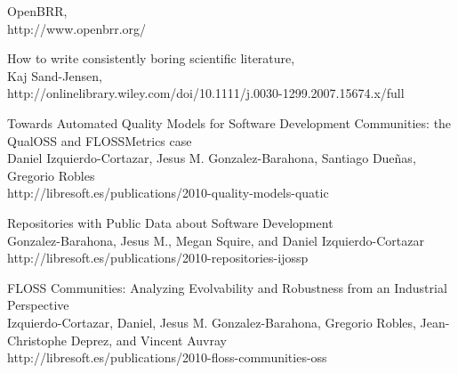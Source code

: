 \documentclass[11pt]{scrartcl}
\begin{document}
\begin{thebibliography}{9}

  OpenBRR,\\
  http://www.openbrr.org/

  How to write consistently boring scientific literature,\\
  Kaj Sand-Jensen,\\
  http://onlinelibrary.wiley.com/doi/10.1111/j.0030-1299.2007.15674.x/full

    Towards Automated Quality Models for Software Development Communities: the QualOSS and FLOSSMetrics case\\
    Daniel Izquierdo-Cortazar, Jesus M. Gonzalez-Barahona, Santiago Due\~nas, Gregorio Robles\\
    http://libresoft.es/publications/2010-quality-models-quatic

    Repositories with Public Data about Software Development\\
    Gonzalez-Barahona, Jesus M., Megan Squire, and Daniel Izquierdo-Cortazar\\
    http://libresoft.es/publications/2010-repositories-ijossp

    FLOSS Communities: Analyzing Evolvability and Robustness from an Industrial Perspective\\
    Izquierdo-Cortazar, Daniel, Jesus M. Gonzalez-Barahona, Gregorio Robles, Jean-Christophe Deprez, and Vincent Auvray\\
    http://libresoft.es/publications/2010-floss-communities-oss

\end{thebibliography}
\end{document}
